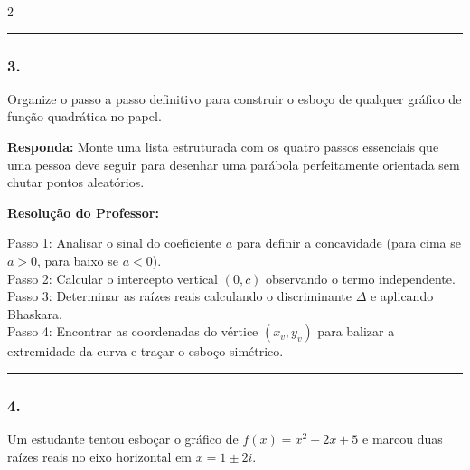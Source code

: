 \begin{multicols*}{2}
\par\vspace{\espacoQuestao}

\noindent\textcolor{CorLinha}{\rule{\linewidth}{0.5pt}} 
\par\vspace{\espacoPreQuestao}
\subsubsection*{3.} Organize o passo a passo definitivo para construir o esboço de qualquer gráfico de função quadrática no papel.

\begin{boxresponda}
\textbf{Responda:} Monte uma lista estruturada com os quatro passos essenciais que uma pessoa deve seguir para desenhar uma parábola perfeitamente orientada sem chutar pontos aleatórios.
\end{boxresponda}

\ifgabarito
    \begin{tcolorbox}[colback=CorTitUm!5, colframe=CorTitUm, boxrule=1pt, arc=4pt, left=6pt, right=6pt, top=6pt, bottom=6pt]
    \small\textbf{\textcolor{CorTitUm}{Resolução do Professor:}}\par\vspace{0.1cm}
    \color{CinzaEscuro}
    Passo 1: Analisar o sinal do coeficiente $a$ para definir a concavidade (para cima se $a>0$, para baixo se $a<0$). \\
    Passo 2: Calcular o intercepto vertical $(0, c)$ observando o termo independente. \\
    Passo 3: Determinar as raízes reais calculando o discriminante $\Delta$ e aplicando Bhaskara. \\
    Passo 4: Encontrar as coordenadas do vértice $(x_v, y_v)$ para balizar a extremidade da curva e traçar o esboço simétrico.
    \end{tcolorbox}
\fi

\par\vspace{\espacoQuestao}

\noindent\textcolor{CorLinha}{\rule{\linewidth}{0.5pt}} 
\par\vspace{\espacoPreQuestao}
\subsubsection*{4.} Um estudante tentou esboçar o gráfico de $f(x) = x^2 - 2x + 5$ e marcou duas raízes reais no eixo horizontal em $x = 1 \pm 2i$.


\end{multicols*}
